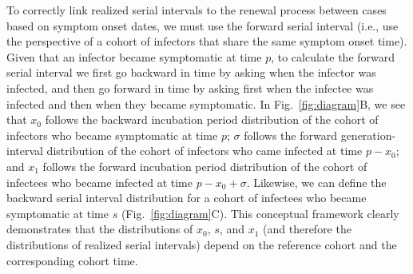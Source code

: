 \documentclass[12pt]{article}
\newcommand{\fref}[1]{Fig.~\ref{fig:#1}}
\newcommand{\psymp}{\ensuremath{p}} %
\newcommand{\ssymp}{\ensuremath{s}} %
\newcommand{\gtime}{\sigma} %
\begin{document}
To correctly link realized serial intervals to the renewal process between cases based on symptom onset dates, we must use the forward serial interval (i.e., use the perspective of a cohort of infectors that share the same symptom onset time). 
Given that an infector became symptomatic at time $\psymp$, to calculate the forward serial interval we first go backward in time by asking when the infector was infected, and then go forward in time by asking first when the infectee was infected and then when they became symptomatic.
In \fref{diagram}B, we see that $x_0$ follows the backward incubation period distribution of the cohort of infectors who became symptomatic at time $\psymp$;
$\gtime$ follows the forward generation-interval distribution of the cohort of infectors who came infected at time $\psymp - x_0$;
and $x_1$ follows the forward incubation period distribution of the cohort of infectees who became infected at time $\psymp - x_0 + \gtime$.
Likewise, we can define the backward serial interval distribution for a cohort of infectees who became symptomatic at time $\ssymp$ (\fref{diagram}C).
This conceptual framework clearly demonstrates that the distributions of $x_0$, $\ssymp$, and $x_1$ (and therefore the distributions of realized serial intervals) depend on the reference cohort and the corresponding cohort time.
\end{document}
